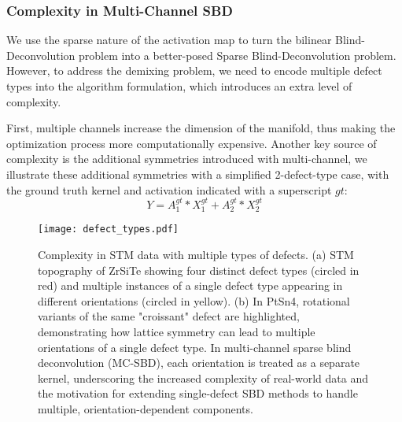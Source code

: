 \subsubsection{Complexity in Multi-Channel SBD}
We use the sparse nature of the activation map to turn the bilinear Blind-Deconvolution problem into a better-posed Sparse Blind-Deconvolution problem. However, to address the demixing problem, we need to encode multiple defect types into the algorithm formulation, which introduces an extra level of complexity. 

First, multiple channels increase the dimension of the manifold, thus making the optimization process more computationally expensive. Another key source of complexity is the additional symmetries introduced with multi-channel, we illustrate these additional symmetries with a simplified 2-defect-type case, with the ground truth kernel and activation indicated with a superscript $gt$: 
\begin{equation*}
	Y = A_1^{gt}*X_1^{gt} + A_2^{gt}*X_2^{gt}
\end{equation*} 

\begin{figure}
	\texttt{[image: defect\_types.pdf]} 
	\centering
	\caption{Complexity in STM data with multiple types of defects. (a) STM topography of ZrSiTe showing four distinct defect types (circled in red) and multiple instances of a single defect type appearing in different orientations (circled in yellow). (b) In PtSn4, rotational variants of the same "croissant" defect are highlighted, demonstrating how lattice symmetry can lead to multiple orientations of a single defect type. In multi-channel sparse blind deconvolution (MC-SBD), each orientation is treated as a separate kernel, underscoring the increased complexity of real-world data and the motivation for extending single-defect SBD methods to handle multiple, orientation-dependent components.}
	\label{fig:ch6_defect}
\end{figure}

